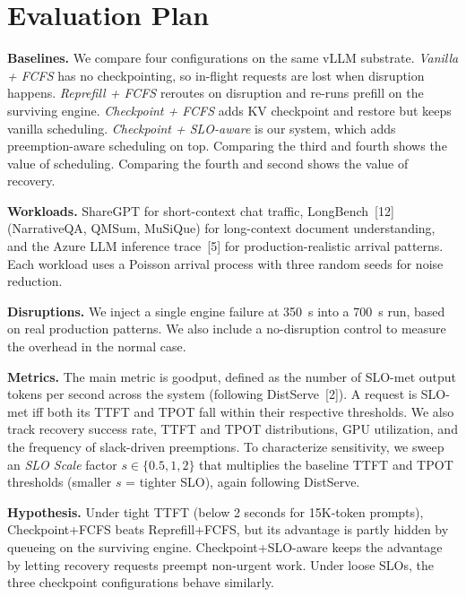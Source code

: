 \documentclass[11pt]{article}
\begin{document}
\section*{Evaluation Plan}
\textbf{Baselines.} We compare four configurations on the same vLLM substrate. \emph{Vanilla + FCFS} has no checkpointing, so in-flight requests are lost when disruption happens. \emph{Reprefill + FCFS} reroutes on disruption and re-runs prefill on the surviving engine. \emph{Checkpoint + FCFS} adds KV checkpoint and restore but keeps vanilla scheduling. \emph{Checkpoint + SLO-aware} is our system, which adds preemption-aware scheduling on top. Comparing the third and fourth shows the value of scheduling. Comparing the fourth and second shows the value of recovery.
 
\textbf{Workloads.} ShareGPT for short-context chat traffic, LongBench~[12] (NarrativeQA, QMSum, MuSiQue) for long-context document understanding, and the Azure LLM inference trace~[5] for production-realistic arrival patterns. Each workload uses a Poisson arrival process with three random seeds for noise reduction.
 
\textbf{Disruptions.} We inject a single engine failure at 350~s into a 700~s run, based on real production patterns. We also include a no-disruption control to measure the overhead in the normal case.
 
\textbf{Metrics.} The main metric is goodput, defined as the number of SLO-met output tokens per second across the system (following DistServe~[2]). A request is SLO-met iff both its TTFT and TPOT fall within their respective thresholds. We also track recovery success rate, TTFT and TPOT distributions, GPU utilization, and the frequency of slack-driven preemptions. To characterize sensitivity, we sweep an \emph{SLO Scale} factor $s \in \{0.5, 1, 2\}$ that multiplies the baseline TTFT and TPOT thresholds (smaller $s$ = tighter SLO), again following DistServe.
 
\textbf{Hypothesis.} Under tight TTFT (below 2 seconds for 15K-token prompts), Checkpoint+FCFS beats Reprefill+FCFS, but its advantage is partly hidden by queueing on the surviving engine. Checkpoint+SLO-aware keeps the advantage by letting recovery requests preempt non-urgent work. Under loose SLOs, the three checkpoint configurations behave similarly.
 
\end{document}
